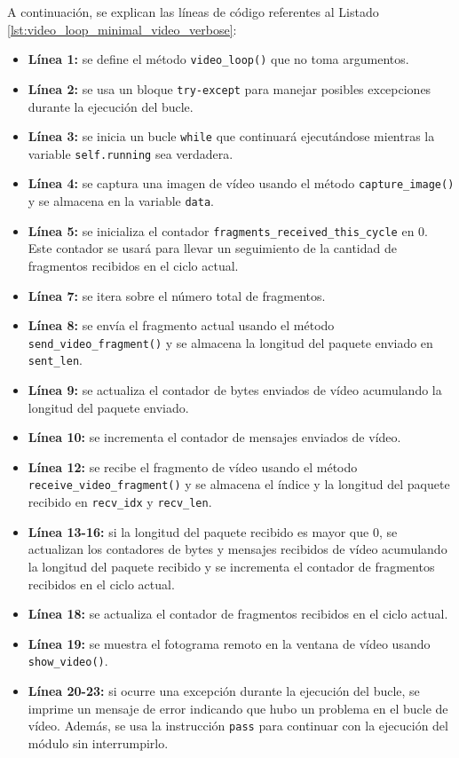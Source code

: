 A continuación, se explican las líneas de código referentes al Listado \ref{lst:video_loop_minimal_video_verbose}:
\begin{itemize}
    \item \textbf{Línea 1:} se define el método \texttt{video\_loop()} que no toma argumentos.
    \item \textbf{Línea 2:} se usa un bloque \texttt{try-except} para manejar posibles excepciones durante la ejecución del bucle.
    \item \textbf{Línea 3:} se inicia un bucle \texttt{while} que continuará ejecutándose mientras la variable \texttt{self.running} sea verdadera.
    \item \textbf{Línea 4:} se captura una imagen de vídeo usando el método \texttt{capture\_image()} y se almacena en la variable \texttt{data}.
    \item \textbf{Línea 5:} se inicializa el contador \texttt{fragments\_received\_this\_cycle} en 0. Este contador se usará para llevar un seguimiento de la cantidad de fragmentos recibidos en el ciclo actual.
    \item \textbf{Línea 7:} se itera sobre el número total de fragmentos.
    \item \textbf{Línea 8:} se envía el fragmento actual usando el método \texttt{send\_video\_fragment()} y se almacena la longitud del paquete enviado en \texttt{sent\_len}.
    \item \textbf{Línea 9:} se actualiza el contador de bytes enviados de vídeo acumulando la longitud del paquete enviado.
    \item \textbf{Línea 10:} se incrementa el contador de mensajes enviados de vídeo.
    \item \textbf{Línea 12:} se recibe el fragmento de vídeo usando el método \texttt{receive\_video\_fragment()} y se almacena el índice y la longitud del paquete recibido en \texttt{recv\_idx} y \texttt{recv\_len}.
    \item \textbf{Línea 13-16:} si la longitud del paquete recibido es mayor que 0, se actualizan los contadores de bytes y mensajes recibidos de vídeo acumulando la longitud del paquete recibido y se incrementa el contador de fragmentos recibidos en el ciclo actual.
    \item \textbf{Línea 18:} se actualiza el contador de fragmentos recibidos en el ciclo actual.
    \item \textbf{Línea 19:} se muestra el fotograma remoto en la ventana de vídeo usando \texttt{show\_video()}.
    \item \textbf{Línea 20-23:} si ocurre una excepción durante la ejecución del bucle, se imprime un mensaje de error indicando que hubo un problema en el bucle de vídeo. Además, se usa la instrucción \texttt{pass} para continuar con la ejecución del módulo sin interrumpirlo. 
\end{itemize}
\vspace{\baselineskip}


